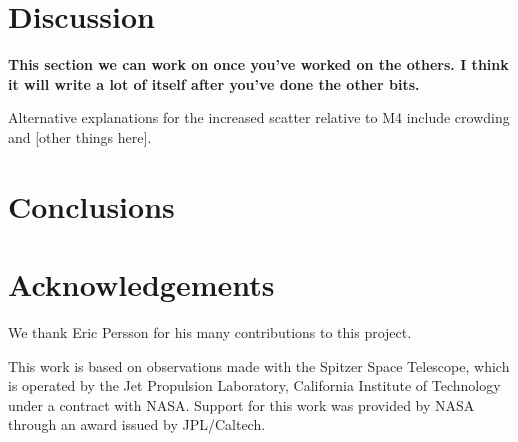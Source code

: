 \documentclass[a4paper,fleqn,usenatbib]{mnras}
\begin{document}
\section{Discussion}
\label{sec:discussion}

{\bf This section we can work on once you've worked on the others. I think it will write a lot of itself after you've done the other bits.}

Alternative explanations for the increased scatter relative to M4 include crowding and [other things here].

\section{Conclusions}
\label{sec:conclusions}

\section*{Acknowledgements}
\label{sec:acknowledgements}

We thank Eric Persson for his many contributions to this project.

This work is based on observations made with the Spitzer Space Telescope, which is operated by the Jet Propulsion Laboratory, California Institute of Technology under a contract with NASA. Support for this work was provided by NASA through an award issued by JPL/Caltech.












\clearpage
\newpage

\appendix
\end{document}
